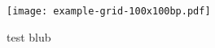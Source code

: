 \documentclass{beamer}
\begin{document}
    \begin{frame}
        \texttt{[image: example-grid-100x100bp.pdf]}
    \end{frame}

    \begin{frame}
        \begin{center}
            \begin{minipage}{.9\textwidth}
                \begin{block}{test}
                    blub
                \end{block} 
            \end{minipage}
        \end{center}
    \end{frame}
\end{document}
